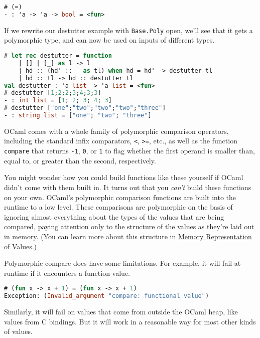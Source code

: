 \begin{lstlisting}[language=Caml]
# (=)
- : 'a -> 'a -> bool = <fun>
\end{lstlisting}

If we rewrite our destutter example with
\passthrough{\lstinline!Base.Poly!} open, we'll see that it gets a
polymorphic type, and can now be used on inputs of different types.

\begin{lstlisting}[language=Caml]
# let rec destutter = function
    | [] | [_] as l -> l
    | hd :: (hd' :: _ as tl) when hd = hd' -> destutter tl
    | hd :: tl -> hd :: destutter tl
val destutter : 'a list -> 'a list = <fun>
# destutter [1;2;2;3;4;3;3]
- : int list = [1; 2; 3; 4; 3]
# destutter ["one";"two";"two";"two";"three"]
- : string list = ["one"; "two"; "three"]
\end{lstlisting}

OCaml comes with a whole family of polymorphic comparison operators,
including the standard infix comparators, \passthrough{\lstinline!<!},
\passthrough{\lstinline!>=!}, etc., as well as the function
\passthrough{\lstinline!compare!} that returns
\passthrough{\lstinline!-1!}, \passthrough{\lstinline!0!}, or
\passthrough{\lstinline!1!} to flag whether the first operand is smaller
than, equal to, or greater than the second, respectively.

You might wonder how you could build functions like these yourself if
OCaml didn't come with them built in. It turns out that you \emph{can't}
build these functions on your own. OCaml's polymorphic comparison
functions are built into the runtime to a low level. These comparisons
are polymorphic on the basis of ignoring almost everything about the
types of the values that are being compared, paying attention only to
the structure of the values as they're laid out in memory. (You can
learn more about this structure in
\href{runtime-memory-layout.html}{Memory Representation of Values}.)

Polymorphic compare does have some limitations. For example, it will
fail at runtime if it encounters a function value.

\begin{lstlisting}[language=Caml]
# (fun x -> x + 1) = (fun x -> x + 1)
Exception: (Invalid_argument "compare: functional value")
\end{lstlisting}

Similarly, it will fail on values that come from outside the OCaml heap,
like values from C bindings. But it will work in a reasonable way for
most other kinds of values.

